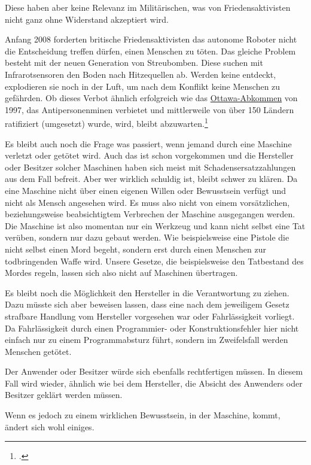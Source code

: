 Diese haben aber keine Relevanz im Militärischen,
was von Friedensaktivisten nicht ganz ohne Widerstand akzeptiert wird.

Anfang 2008 forderten britische Friedensaktivisten das
autonome Roboter nicht die Entscheidung treffen dürfen,
einen Menschen zu töten.
Das gleiche Problem besteht mit der neuen Generation von
Streubomben. Diese suchen mit Infrarotsensoren den Boden nach
Hitzequellen ab. Werden keine entdeckt, explodieren sie noch in der
Luft, um nach dem Konflikt keine Menschen zu gefährden. Ob dieses
Verbot ähnlich erfolgreich wie das
\href{http://www.un.org/millennium/law/xxvi-22.htm}{Ottawa-Abkommen}
von 1997, das Antipersonenminen verbietet und mittlerweile von über
150 Ländern ratifiziert (umgesetzt) wurde, wird, bleibt
abzuwarten.\footcite{heise:VerbotvonKampfrobotern}

\bigskip

Es bleibt auch noch die Frage was passiert,
wenn jemand durch eine Maschine verletzt oder getötet wird.
Auch das ist schon vorgekommen und die
Hersteller oder Besitzer solcher Maschinen haben sich meist mit
Schadensersatzzahlungen aus dem Fall befreit.
Aber wer wirklich schuldig ist, bleibt schwer zu klären.
Da eine Maschine nicht über einen eigenen Willen oder Bewusstsein verfügt
und nicht als Mensch angesehen wird.
Es muss also nicht von einem vorsätzlichen,
beziehungsweise beabsichtigtem Verbrechen der Maschine ausgegangen werden.
Die Maschine ist also momentan nur ein Werkzeug und kann nicht selbst eine Tat verüben,
sondern nur dazu gebaut werden.
Wie beispielsweise eine Pistole die nicht selbst einen Mord begeht,
sondern erst durch einen Menschen zur todbringenden Waffe wird.
Unsere Gesetze, die beispielsweise den Tatbestand des Mordes regeln,
lassen sich also nicht auf Maschinen übertragen.

Es bleibt noch die Möglichkeit den Hersteller in die Verantwortung zu
ziehen.
Dazu müsste sich aber beweisen lassen, dass eine nach dem jeweiligem Gesetz
strafbare Handlung vom Hersteller vorgesehen war oder Fahrlässigkeit vorliegt.
Da Fahrlässigkeit durch einen Programmier- oder Konstruktionsfehler hier
nicht einfach nur zu einem Programmabsturz führt,
sondern im Zweifelsfall werden Menschen getötet.

Der Anwender oder Besitzer würde sich ebenfalls rechtfertigen müssen.
In diesem Fall wird wieder, ähnlich wie bei dem Hersteller,
die Absicht des Anwenders oder Besitzer geklärt werden müssen.

Wenn es jedoch zu einem wirklichen Bewusstsein, in der Maschine,
kommt, ändert sich wohl einiges.

